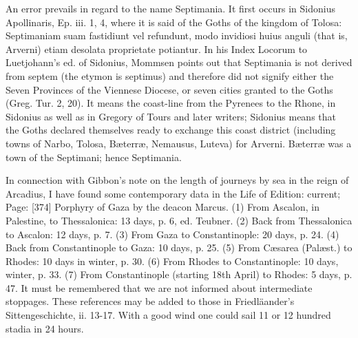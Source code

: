 
An error prevails in regard to the name Septimania. It first occurs in Sidonius Apollinaris, Ep. iii. 1, 4, where it is said of the Goths of the kingdom of Tolosa: Septimaniam suam fastidiunt vel refundunt, modo invidiosi huius anguli (that is, Arverni) etiam desolata proprietate potiantur. In his Index Locorum to Luetjohann\texthebrew{}’s ed. of Sidonius, Mommsen points out that Septimania is not derived from septem (the etymon is septimus) and therefore did not signify either the Seven Provinces of the Viennese Diocese, or seven cities granted to the Goths (Greg. Tur. 2, 20). It means the coast-line from the Pyrenees to the Rhone, in Sidonius as well as in Gregory of Tours and later writers; Sidonius means that the Goths declared themselves ready to exchange this coast district (including towns of Narbo, Tolosa, Bæterræ, Nemausus, Luteva) for Arverni. Bæterræ was a town of the Septimani; hence Septimania.


In connection with Gibbon\texthebrew{}’s note on the length of journeys by sea in the reign of Arcadius, I have found some contemporary data in the Life of Edition: current; Page: [374] Porphyry of Gaza by the deacon Marcus. (1) From Ascalon, in Palestine, to Thessalonica: 13 days, p. 6, ed. Teubner. (2) Back from Thessalonica to Ascalon: 12 days, p. 7. (3) From Gaza to Constantinople: 20 days, p. 24. (4) Back from Constantinople to Gaza: 10 days, p. 25. (5) From Cæsarea (Palæst.) to Rhodes: 10 days in winter, p. 30. (6) From Rhodes to Constantinople: 10 days, winter, p. 33. (7) From Constantinople (starting 18th April) to Rhodes: 5 days, p. 47. It must be remembered that we are not informed about intermediate stoppages. These references may be added to those in Friedläander\texthebrew{}’s Sittengeschichte, ii. 13-17. With a good wind one could sail 11 or 12 hundred stadia in 24 hours.


